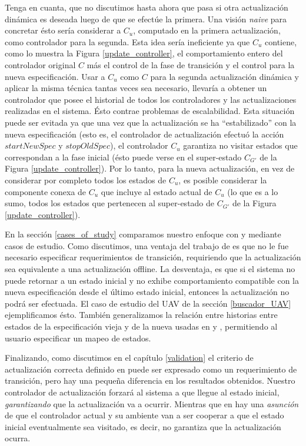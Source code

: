 Tenga en cuanta, que no discutimos hasta ahora que pasa si otra actualización dinámica es deseada luego de que se
efectúe la primera. Una visión \emph{naive} para concretar ésto sería considerar a $C_u$, computado en la primera
actualización, como controlador para la segunda. Esta idea sería ineficiente ya que  $C_u$ contiene, como lo muestra la
Figura \ref{update_controller}, el comportamiento entero del controlador original $C$ más el control de la fase de transición y el
control para la nueva especificación. Usar a $C_u$ como $C$ para la segunda actualización dinámica y aplicar la misma
técnica tantas veces sea necesario, llevaría a obtener un controlador que posee el historial de todos los controladores
y las actualizaciones realizadas en el sistema. Ésto contrae problemas de escalabilidad. Esta situación puede ser
evitada ya que una vez que la actualización se ha ``estabilizado'' con la nueva especificación (esto es, el controlador
de actualización efectuó la acción $startNewSpec$ y $stopOldSpec$), el controlador $C_u$ garantiza no visitar estados
que correspondan a la fase inicial (ésto puede verse en el super-estado $C_{G'}$ de la Figura \ref{update_controller}).
Por lo tanto, para la nueva actualización, en vez de considerar por completo todos los estados de $C_u$, es posible
considerar la componente conexa de $C_u$ que incluye al estado actual de $C_u$ (lo que es a lo sumo, todos los estados
que pertenecen al super-estado de $C_{G'}$ de la Figura \ref{update_controller}).

En la sección \ref{cases_of_study} comparamos nuestro enfoque con \cite{6224401} y
\cite{PanzicaLaManna:2013:FCC:2487336.2487349} mediante casos de estudio. Como discutimos, una ventaja del trabajo de
\cite{6224401} es que no le fue necesario especificar requerimientos de transición, requiriendo que la actualización sea
equivalente a una actualización offline. La desventaja, es que si el sistema no puede retornar a un estado inicial y no
exhibe comportamiento compatible con la nueva especificación desde el último estado inicial, entonces la actualización
no podrá ser efectuada. El caso de estudio del UAV de la sección \ref{buscador_UAV} ejemplificamos ésto. También
generalizamos la relación entre historias entre estados de la especificación vieja y de la nueva usadas en
\cite{6224401} y \cite{PanzicaLaManna:2013:FCC:2487336.2487349}, permitiendo al usuario especificar un mapeo de estados.

Finalizando, como discutimos en el capítulo \ref{validation} el criterio de actualización correcta definido en
\cite{6224401} puede ser expresado como un requerimiento de transición, pero hay una pequeña diferencia en los
resultados obtenidos. Nuestro controlador de actualización forzará al sistema a que llegue al estado inicial,
\emph{garantizando} que la actualización va a ocurrir. Mientras que en \cite{6224401} hay una \emph{asunción} de que el
controlador actual y su ambiente van a ser cooperar a que el estado inicial eventualmente sea visitado, es decir, no
garantiza que la actualización ocurra.
